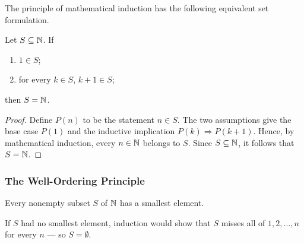 The principle of mathematical induction has the following\newline
equivalent set formulation.
\begin{proposition}\label{prop:induction-set-form}
    Let $S\subseteq\mathbb{N}$. If
    \begin{enumerate}
        \item $1\in S$;
        \item for every $k\in S$, $k+1\in S$;
    \end{enumerate}
    then $S=\mathbb{N}$.
\end{proposition}

\begin{proof}
    Define $P(n)$ to be the statement $n\in S$. The two assumptions give the base case $P(1)$ and the inductive implication $P(k)\Rightarrow P(k+1)$. Hence, by mathematical induction, every $n\in\mathbb{N}$ belongs to $S$. Since $S\subseteq\mathbb{N}$, it follows that $S=\mathbb{N}$.
\end{proof}

\subsubsection{The Well-Ordering Principle}
\begin{theorem}\label{thm:well-ordering}
    Every nonempty subset $S$ of $\mathbb{N}$ has a smallest element.
\end{theorem}

\begin{idea}
    If $S$ had no smallest element, induction would show that $S$ misses all of $1,2,\ldots,n$ for every $n$ --- so $S=\emptyset$.
\end{idea}

